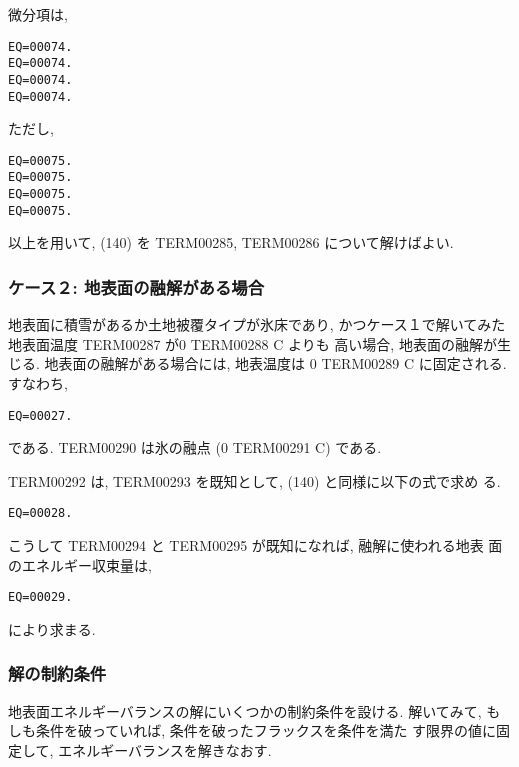 微分項は,
\begin{verbatim}
EQ=00074.
EQ=00074.
EQ=00074.
EQ=00074.
\end{verbatim}
ただし,
\begin{verbatim}
EQ=00075.
EQ=00075.
EQ=00075.
EQ=00075.
\end{verbatim}

以上を用いて, (140) を TERM00285, TERM00286 について解けばよい.

\subsubsection{ケース２: 地表面の融解がある場合}

地表面に積雪があるか土地被覆タイプが氷床であり, かつケース１で解いてみた
地表面温度 TERM00287 が0 TERM00288 C よりも
高い場合, 地表面の融解が生じる.
地表面の融解がある場合には, 地表温度は 0 TERM00289 C に固定される.
すなわち,
\begin{verbatim}
EQ=00027.
\end{verbatim}
である. TERM00290 は氷の融点 (0 TERM00291 C) である.

TERM00292 は, TERM00293 を既知として, (140) と同様に以下の式で求め
る.
\begin{verbatim}
EQ=00028.
\end{verbatim}

こうして TERM00294 と TERM00295 が既知になれば, 融解に使われる地表
面のエネルギー収束量は,
\begin{verbatim}
EQ=00029.
\end{verbatim}
により求まる.

\subsubsection{解の制約条件}

地表面エネルギーバランスの解にいくつかの制約条件を設ける.
解いてみて, もしも条件を破っていれば, 条件を破ったフラックスを条件を満た
す限界の値に固定して, エネルギーバランスを解きなおす.

